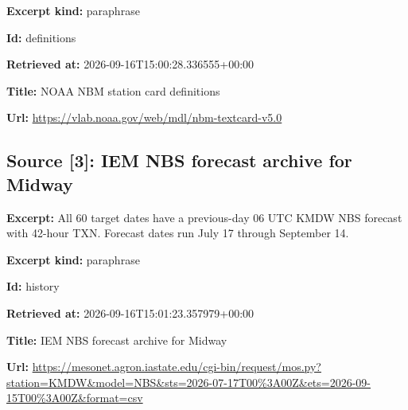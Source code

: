\documentclass[11pt]{article}
\begin{document}
\par\noindent\textbf{Excerpt kind:} paraphrase

\par\noindent\textbf{Id:} definitions

\par\noindent\textbf{Retrieved at:} 2026-09-16T1\hspace{0pt}5:00:28.3365\hspace{0pt}55+00:00

\par\noindent\textbf{Title:} NOAA NBM station card definitions

\par\noindent\textbf{Url:} \href{https://vlab.noaa.gov/web/mdl/nbm-textcard-v5.0}{https://vlab\hspace{0pt}.noaa.gov/we\hspace{0pt}b/mdl/nbm-te\hspace{0pt}xtcard-v5.0}

\subsection*{\textcolor{epdarkgreen}{Source [3]: IEM NBS forecast archive for Midway}}
\par\noindent\textbf{Excerpt:} All 60 target dates have a previous-day 06 UTC KMDW NBS forecast with 42-hour TXN. Forecast dates run July 17 through September 14.

\par\noindent\textbf{Excerpt kind:} paraphrase

\par\noindent\textbf{Id:} history

\par\noindent\textbf{Retrieved at:} 2026-09-16T1\hspace{0pt}5:01:23.3579\hspace{0pt}79+00:00

\par\noindent\textbf{Title:} IEM NBS forecast archive for Midway

\par\noindent\textbf{Url:} \href{https://mesonet.agron.iastate.edu/cgi-bin/request/mos.py?station=KMDW\&model=NBS\&sts=2026-07-17T00\%3A00Z\&ets=2026-09-15T00\%3A00Z\&format=csv}{https://meso\hspace{0pt}net.agron.ia\hspace{0pt}state.edu/cg\hspace{0pt}i-bin/reques\hspace{0pt}t/mos.py?sta\hspace{0pt}tion=KMDW\&mo\hspace{0pt}del=NBS\&sts=\hspace{0pt}2026-07-17T0\hspace{0pt}0\%3A00Z\&ets=\hspace{0pt}2026-09-15T0\hspace{0pt}0\%3A00Z\&form\hspace{0pt}at=csv}
\end{document}
